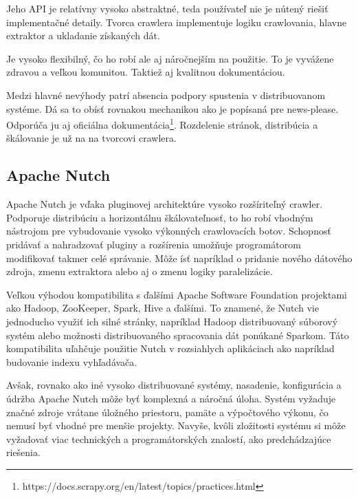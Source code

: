 Jeho API je relatívny vysoko abstraktné, teda používateľ nie je nútený riešiť implementačné detaily. Tvorca crawlera implementuje logiku crawlovania, hlavne extraktor a ukladanie získaných dát.

Je vysoko flexibilný, čo ho robí ale aj náročnejším na použitie. To je vyvážene zdravou a veľkou komunitou. Taktiež aj kvalitnou dokumentáciou. 

Medzi hlavné nevýhody patrí absencia podpory spustenia v distribuovanom systéme. Dá sa to obísť rovnakou mechanikou ako je popísaná pre news-please. Odporúča ju aj oficiálna dokumentácia\footnote{https://docs.scrapy.org/en/latest/topics/practices.html}. Rozdelenie stránok, distribúcia a škálovanie je už na na tvorcovi crawlera. 

\subsection{Apache Nutch}
Apache Nutch je vďaka pluginovej architektúre vysoko rozšíriteľný crawler. Podporuje distribúciu a horizontálnu škálovateľnosť, to ho robí vhodným nástrojom pre vybudovanie vysoko výkonných crawlovacích botov. Schopnosť pridávať a nahradzovať pluginy a rozšírenia umožňuje programátorom modifikovať takmer celé správanie. Môže ísť napríklad o pridanie nového dátového zdroja, zmenu extraktora alebo aj o zmenu logiky paralelizácie. 

Veľkou výhodou kompatibilita s ďalšími Apache Software Foundation projektami ako Hadoop, ZooKeeper, Spark, Hive a ďalšími. To znamené, že Nutch vie jednoducho využiť ich silné stránky, napríklad Hadoop distribuovaný súborový systém alebo možnosti distribuovaného spracovania dát ponúkané Sparkom. Táto kompatibilita uľahčuje použitie Nutch v rozsiahlych aplikáciach ako napríklad budovanie indexu vyhľadávača. 

Avšak, rovnako ako iné vysoko distribuované systémy, nasadenie, konfigurácia a údržba Apache Nutch môže byť komplexná a náročná úloha. Systém vyžaduje značné zdroje vrátane úložného priestoru, pamäte a výpočtového výkonu, čo nemusí byť vhodné pre menšie projekty. Navyše, kvôli zložitosti systému si môže vyžadovať viac technických a programátorských znalostí, ako predchádzajúce riešenia.
